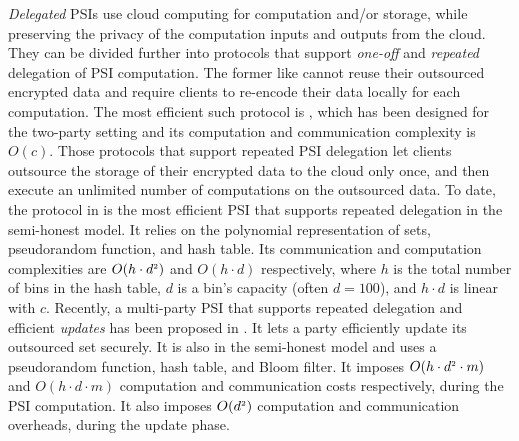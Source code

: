  \textit{Delegated} PSIs use  cloud computing  for computation and/or storage, while preserving the privacy of  the computation inputs and outputs from the cloud. They can be divided further into protocols that support \textit{one-off} and \textit{repeated} delegation of PSI computation. The former like \cite{kamarascaling,kerschbaum12,c18} cannot reuse their outsourced encrypted data and require clients to re-encode their data locally for each  computation. The most efficient such protocol is \cite{kamarascaling}, which has been designed for the two-party setting and its computation and communication complexity is $O(c)$.  Those protocols that support repeated PSI delegation let clients outsource the storage of their encrypted data to the cloud only once, and then execute an unlimited number of computations on the outsourced data. 
To date, the protocol in \cite{eopsi} is the most efficient PSI that supports repeated delegation in the semi-honest model. It relies on the polynomial representation of sets, pseudorandom function, and hash table. Its communication and computation complexities are $O(h\cdot d^{\scriptscriptstyle 2})$ and $O(h\cdot d)$ respectively, where $h$ is the total number of bins in the hash table, $d$ is a bin's capacity (often $d=100$), and $h\cdot d$ is linear with $c$.  Recently, a multi-party PSI that supports repeated delegation and efficient \emph{updates} has been proposed in \cite{AbadiDMT22}. It lets a party efficiently update its outsourced set securely. It is also in the semi-honest model and uses a pseudorandom function, hash table, and Bloom filter. It imposes $O(h\cdot d^{\scriptscriptstyle 2}\cdot m)$ and $O(h\cdot d\cdot m)$  computation and communication costs respectively, during the PSI computation. It also imposes $O(d^{\scriptscriptstyle 2})$  computation and communication overheads, during the update phase.  








 
 
 